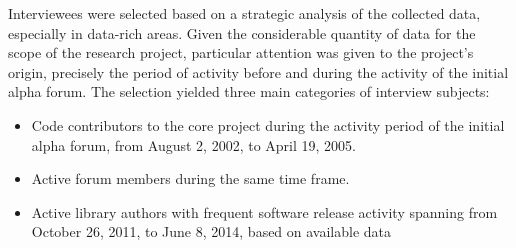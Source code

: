 

  
Interviewees were selected based on a strategic analysis of the collected data, especially in data-rich areas. Given the considerable quantity of data for the scope of the research project, particular attention was given to the project’s origin, precisely the period of activity before and during the activity of the initial alpha forum. The selection yielded three main categories of interview subjects:
  
\begin{itemize}
    \item Code contributors to the core project during the activity period of the initial alpha forum, from August 2, 2002, to April 19, 2005.
    \item Active forum members during the same time frame.
    \item Active library authors with frequent software release activity spanning from October 26, 2011, to June 8, 2014, based on available data
\end{itemize}


